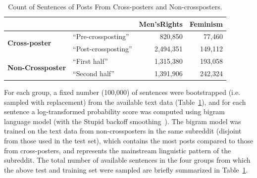 \documentclass[letterpaper]{article}
\begin{document}
\begin{table}
    \caption{Count of Sentences of Posts From Cross-posters and Non-crossposters.}
    \centering
    \begin{adjustbox}{max width=\columnwidth}
    
    \begin{tabular}{|l l| r r|}\hline
        & & Men'sRights & Feminism\\
        \hline
        \hline
        \multirow{2}{*}{\textbf{Cross-poster}}& ``Pre-crossposting'' & 820,850   & 77,460\\
            & ``Post-crossposting''  & 2,494,351 & 149,112\\
            \hline
        \multirow{2}{*}{\textbf{Non-Crossposter}}   & ``First half''      & 1,315,380 & 193,058\\
            & ``Second half''       & 1,391,906 & 242,324\\\hline
    \end{tabular}
    \label{lm:tab1}
    \end{adjustbox}
\end{table}

For each group, a fixed number (100,000) of sentences were bootstrapped (i.e. sampled with replacement) from the available text data (Table~\ref{lm:tab1}), and for each sentence a log-transformed probability score was computed using bigram language model (with the Stupid backoff smoothing~\cite{Brants07largelanguage}). The bigram model was trained on the text data from non-crossposters in the same subreddit (disjoint from those used in the test set), which contains the most posts compared to those from cross-posters, and represents the mainstream linguistic pattern of the subreddit. The total number of available sentences in the four groups from which the above test and training set were sampled are briefly summarized in Table~\ref{lm:tab1}.  

\end{document}
